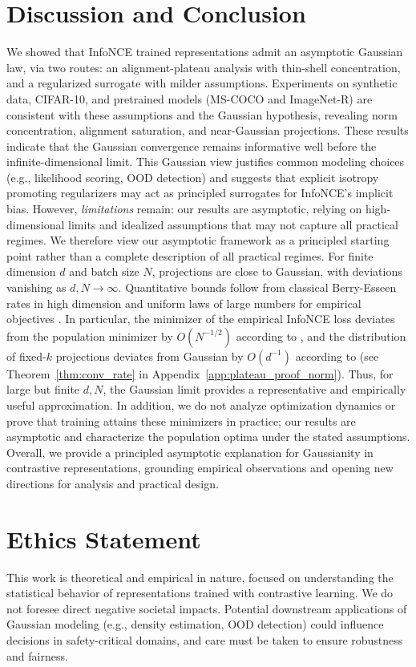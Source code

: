 \documentclass{article}
\begin{document}
\section{Discussion and Conclusion}
We showed that InfoNCE trained representations admit an asymptotic Gaussian law, via two routes: an alignment-plateau analysis with thin-shell concentration, and a regularized surrogate with milder assumptions.  
Experiments on synthetic data, CIFAR-10, and pretrained models (MS-COCO and ImageNet-R) are consistent with these assumptions and the Gaussian hypothesis, revealing norm concentration, alignment saturation, and near-Gaussian projections. These results indicate that the Gaussian convergence remains informative well before the infinite-dimensional limit.
This Gaussian view justifies common modeling choices (e.g., likelihood scoring, OOD detection) and suggests that explicit isotropy promoting regularizers may act as principled surrogates for InfoNCE’s implicit bias.  
However, \emph{limitations} remain: our results are asymptotic, relying on high-dimensional limits and idealized assumptions that may not capture all practical regimes. 
We therefore view our asymptotic framework as a principled starting point rather than a complete description of all practical regimes.
% 
% 
For finite dimension $d$ and batch size $N$, projections are close to Gaussian, with deviations vanishing as $d,N\to\infty$. Quantitative bounds follow from classical Berry-Esseen \citep{vershynin2018high} rates in high dimension and uniform laws of large numbers for empirical objectives \citep{wellner2013weak}. In particular, the minimizer of the empirical InfoNCE loss deviates from the population minimizer by $O(N^{-1/2})$ according to \citet[Thm. 1]{wang2020understanding}, and the distribution of fixed-$k$ projections deviates from Gaussian by $O(d^{-1})$ according to \citet{diaconis1987dozen} (see Theorem~\ref{thm:conv_rate} in Appendix~\ref{app:plateau_proof_norm}). 
Thus, for large but finite $d,N$, the Gaussian limit provides a representative and empirically useful approximation.
% 
In addition, we do not analyze optimization dynamics or prove that training attains these minimizers in practice; our results are asymptotic and characterize the population optima under the stated assumptions.
Overall, we provide a principled asymptotic explanation for Gaussianity in contrastive representations, grounding empirical observations and opening new directions for analysis and practical design.  

\section*{Ethics Statement}
This work is theoretical and empirical in nature, focused on understanding the statistical behavior of representations trained with contrastive learning.  
We do not foresee direct negative societal impacts.  
Potential downstream applications of Gaussian modeling (e.g., density estimation, OOD detection) could influence decisions in safety-critical domains, and care must be taken to ensure robustness and fairness.  
\end{document}
